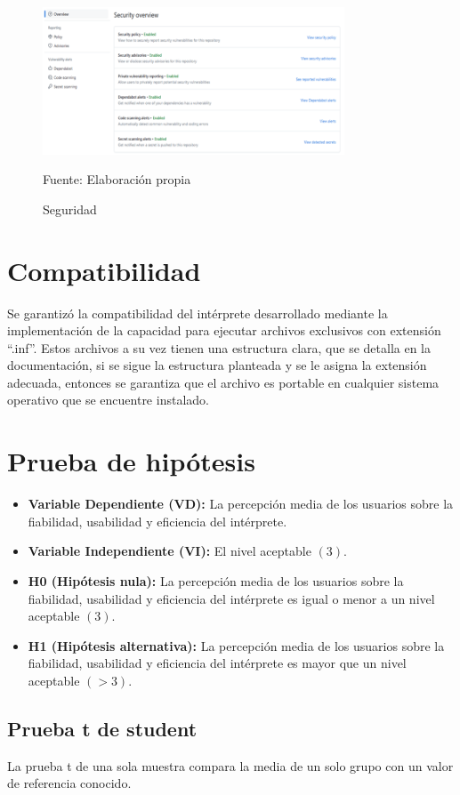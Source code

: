 \begin{figure}[!h]
  \centering
  \includegraphics[width=0.8\textwidth]{images/seguridad.png}
  \caption{Seguridad}
  \centering Fuente: Elaboración propia
  \label{fig:seguridad}
\end{figure}

\section{Compatibilidad}
Se garantizó la compatibilidad del intérprete desarrollado mediante la implementación de la capacidad para ejecutar archivos exclusivos con extensión “.inf”. Estos archivos a su vez tienen una estructura clara, que se detalla en la documentación, si se sigue la estructura planteada y se le asigna la extensión adecuada, entonces se garantiza que el archivo es portable en cualquier sistema operativo que se encuentre instalado.

\section{Prueba de hipótesis}
\begin{itemize}
  \item \textbf{Variable Dependiente (VD):} La percepción media de los usuarios sobre la fiabilidad, usabilidad y eficiencia del intérprete.
  \item \textbf{Variable Independiente (VI):} El nivel aceptable $(3)$.
  \item \textbf{H0 (Hipótesis nula):} La percepción media de los usuarios sobre la fiabilidad, usabilidad y eficiencia del intérprete es igual o menor a un nivel aceptable $(3)$.
  \item \textbf{H1 (Hipótesis alternativa):} La percepción media de los usuarios sobre la fiabilidad, usabilidad y eficiencia del intérprete es mayor que un nivel aceptable $(>3)$.
\end{itemize}

\subsection{Prueba t de student}
La prueba t de una sola muestra compara la media de un solo grupo con un valor de referencia conocido.

